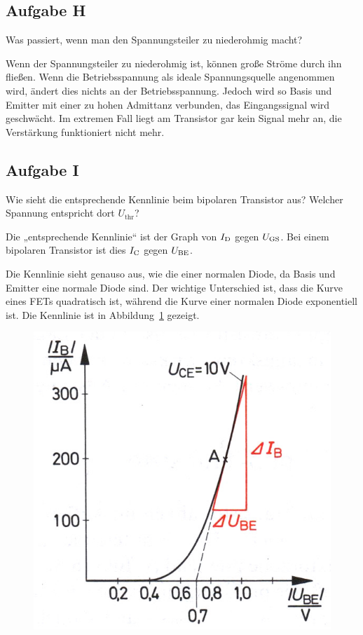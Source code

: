 \FloatBarrier
\subsection{Aufgabe H}

\begin{problem}
	Was passiert, wenn man den Spannungsteiler zu niederohmig macht?
\end{problem}

Wenn der Spannungsteiler zu niederohmig ist, können große Ströme durch ihn
fließen. Wenn die Betriebsspannung als ideale Spannungsquelle angenommen wird,
ändert dies nichts an der Betriebsspannung. Jedoch wird so Basis und Emitter
mit einer zu hohen Admittanz verbunden, das Eingangssignal wird geschwächt. Im
extremen Fall liegt am Transistor gar kein Signal mehr an, die Verstärkung
funktioniert nicht mehr.

\FloatBarrier
\subsection{Aufgabe I}

\begin{problem}
	Wie sieht die entsprechende Kennlinie beim bipolaren Transistor aus?
	Welcher Spannung entspricht dort $U_\text{thr}$?
\end{problem}

Die „entsprechende Kennlinie“ ist der Graph von $I_\text{D}$ gegen $U_\text{GS}$. Bei einem
bipolaren Transistor ist dies $I_\text{C}$ gegen $U_\text{BE}$.

Die Kennlinie sieht genauso aus, wie die einer normalen Diode, da Basis und
Emitter eine normale Diode sind. Der wichtige Unterschied ist, dass die Kurve
eines FETs quadratisch ist, während die Kurve einer normalen Diode exponentiell
ist. Die Kennlinie ist in Abbildung~\ref{fig:beuth-bild-16-9} gezeigt.

\begin{figure}[htbp]
	\centering
	\includegraphics[width=.5\textwidth]{beuth-bild-16-9.jpg}
	\caption{%
		\cite[Bild~16.9]{beuth/elementare_elektronik}
	}
	\label{fig:beuth-bild-16-9}
\end{figure}

